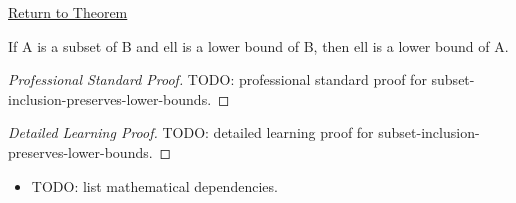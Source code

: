 \newpage
{}
\label{prf:subset-inclusion-preserves-lower-bounds}

\begin{remark*}[Return]
\hyperref[lem:subset-inclusion-preserves-lower-bounds]{Return to Theorem}
\end{remark*}

\begin{lemma*}
If A is a subset of B and ell is a lower bound of B, then ell is a lower bound of A.
\end{lemma*}

\begin{proof}[Professional Standard Proof]
\LRAProofBodyStart
TODO: professional standard proof for subset-inclusion-preserves-lower-bounds.
\end{proof}

\begin{proof}[Detailed Learning Proof]
\LRAProofBodyStart
TODO: detailed learning proof for subset-inclusion-preserves-lower-bounds.
\end{proof}

\begin{remark*}
\end{remark*}

\begin{dependencies}
\begin{itemize}
  \item TODO: list mathematical dependencies.
\end{itemize}
\end{dependencies}

\clearpage
